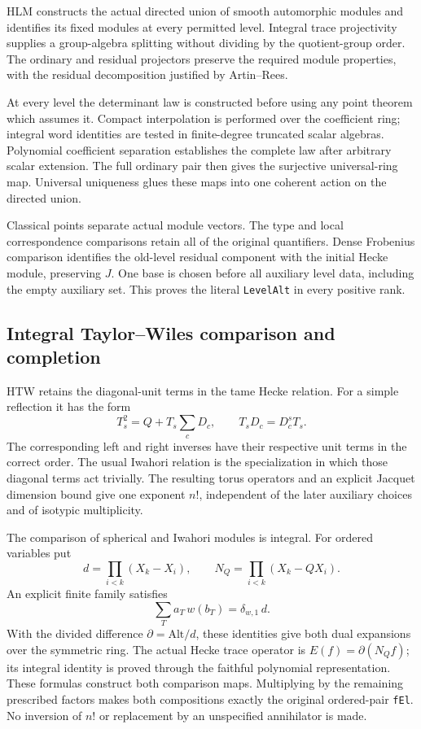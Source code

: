 HLM constructs the actual directed union of smooth automorphic
modules and identifies its fixed modules at every permitted
level.  Integral trace projectivity supplies a group-algebra
splitting without dividing by the quotient-group order.  The
ordinary and residual projectors preserve the required module
properties, with the residual decomposition justified by
Artin--Rees.

At every level the determinant law is constructed before using
any point theorem which assumes it.  Compact interpolation is
performed over the coefficient ring; integral word identities
are tested in finite-degree truncated scalar algebras.  Polynomial
coefficient separation establishes the complete law after
arbitrary scalar extension.  The full ordinary pair then gives
the surjective universal-ring map.  Universal uniqueness glues
these maps into one coherent action on the directed union.

Classical points separate actual module vectors.  The type and
local correspondence comparisons retain all of the original
quantifiers.  Dense Frobenius comparison identifies the old-level
residual component with the initial Hecke module, preserving
$J$.  One base is chosen before all auxiliary level data,
including the empty auxiliary set.  This proves the literal
\texttt{Level\allowbreak Alt} in every positive rank.

\subsection{Integral Taylor--Wiles comparison and completion}

HTW retains the diagonal-unit terms in the tame Hecke relation.
For a simple reflection it has the form
\[
 T_s^2=Q+T_s\sum_c D_c,\qquad T_sD_c=D_c^sT_s.
\]
The corresponding left and right inverses have their respective
unit terms in the correct order.  The usual Iwahori relation is
the specialization in which those diagonal terms act trivially.
The resulting torus operators and an explicit Jacquet dimension
bound give one exponent $n!$, independent of the later auxiliary
choices and of isotypic multiplicity.

The comparison of spherical and Iwahori modules is integral.
For ordered variables put
\[
 d=\prod_{i<k}(X_k-X_i),\qquad
 N_Q=\prod_{i<k}(X_k-QX_i).
\]
An explicit finite family satisfies
\[
              \sum_T a_T\,w(b_T)=\delta_{w,1}\,d.
\]
With the divided difference $\partial=\mathrm{Alt}/d$, these
identities give both dual expansions over the symmetric ring.
The actual Hecke trace operator is
$E(f)=\partial(N_Qf)$; its integral identity is proved through
the faithful polynomial representation.  These formulas construct
both comparison maps.  Multiplying by the remaining prescribed
factors makes both compositions exactly the original ordered-pair
\texttt{f\allowbreak El}.  No inversion of $n!$ or replacement by an
unspecified annihilator is made.

